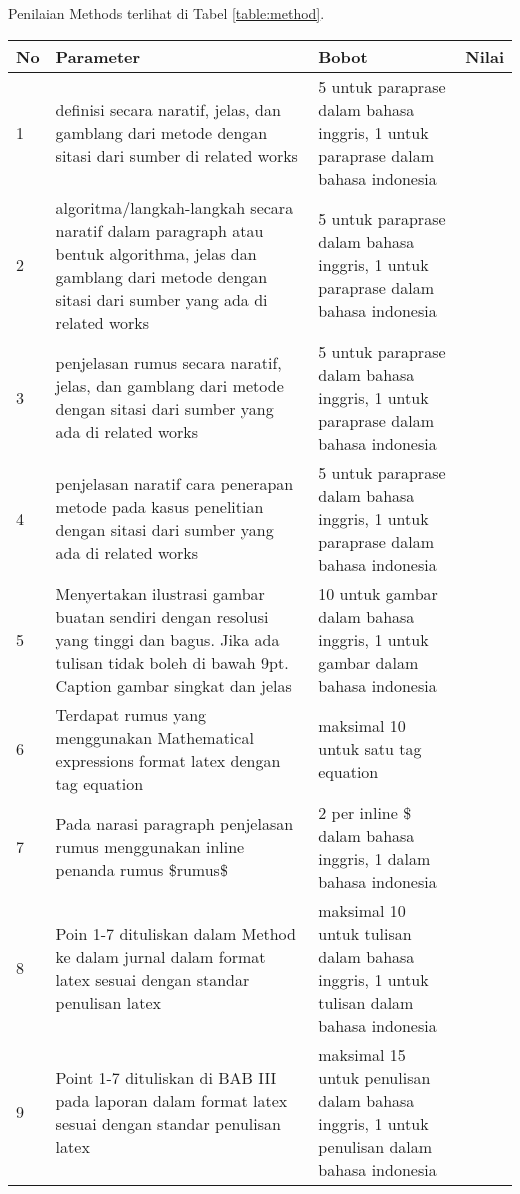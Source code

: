 Penilaian Methods terlihat di Tabel \ref{table:method}.
\begin{longtable}{|p{}|p{}|p{}|p{}|}
\hline
No&Parameter&Bobot&Nilai\\
\hline

1 &definisi secara naratif, jelas, dan gamblang dari metode dengan sitasi dari sumber di related works&5 untuk paraprase dalam bahasa inggris, 1 untuk paraprase dalam bahasa indonesia& \\ \hline

2 &algoritma/langkah-langkah secara naratif dalam paragraph atau bentuk algorithma, jelas dan gamblang dari metode dengan sitasi dari sumber yang ada di related works&5 untuk paraprase dalam bahasa inggris, 1 untuk paraprase dalam bahasa indonesia& \\ \hline

3 &penjelasan rumus secara naratif, jelas, dan gamblang dari metode dengan sitasi dari sumber yang ada di related works&5 untuk paraprase dalam bahasa inggris, 1 untuk paraprase dalam bahasa indonesia& \\ \hline

4 &penjelasan naratif cara penerapan metode pada kasus penelitian dengan sitasi dari sumber yang ada di related works&5 untuk paraprase dalam bahasa inggris, 1 untuk paraprase dalam bahasa indonesia& \\ \hline

5 &Menyertakan ilustrasi gambar buatan sendiri dengan resolusi yang tinggi dan bagus. Jika ada tulisan tidak boleh di bawah 9pt. Caption gambar singkat dan jelas&10 untuk gambar dalam bahasa inggris, 1 untuk gambar dalam bahasa indonesia& \\ \hline

6 &Terdapat rumus yang  menggunakan Mathematical expressions format latex dengan tag equation&maksimal 10 untuk satu tag equation& \\ \hline

7 &Pada narasi paragraph penjelasan rumus menggunakan inline penanda rumus \$rumus\$&2 per inline \$ dalam bahasa inggris, 1 dalam bahasa indonesia& \\ \hline

8 &Poin 1-7 dituliskan dalam Method ke dalam jurnal dalam format latex sesuai dengan standar penulisan latex&maksimal 10 untuk tulisan dalam bahasa inggris, 1 untuk tulisan dalam bahasa indonesia& \\ \hline

9 &Point 1-7 dituliskan di BAB III pada laporan dalam format latex sesuai dengan standar penulisan latex&maksimal 15 untuk penulisan dalam bahasa inggris, 1 untuk penulisan dalam bahasa indonesia& \\ \hline



\end{longtable}
